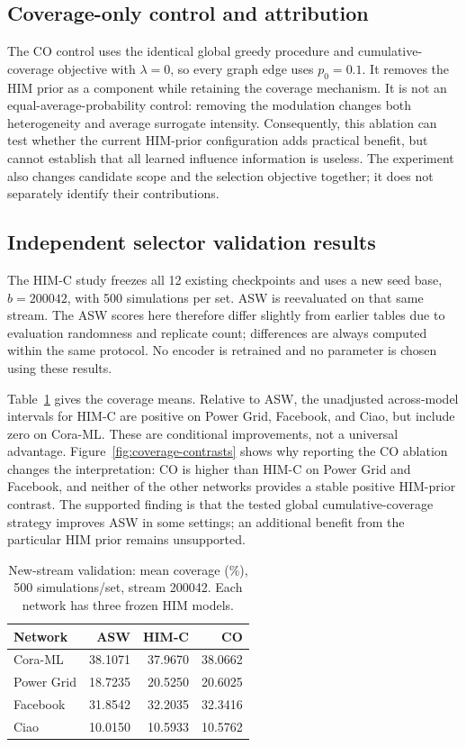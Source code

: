\subsection{Coverage-only control and attribution}
The CO control uses the identical global greedy procedure and cumulative-coverage objective with $\lambda=0$, so every graph edge uses $p_0=0.1$. It removes the HIM prior as a component while retaining the coverage mechanism. It is not an equal-average-probability control: removing the modulation changes both heterogeneity and average surrogate intensity. Consequently, this ablation can test whether the current HIM-prior configuration adds practical benefit, but cannot establish that all learned influence information is useless. The experiment also changes candidate scope and the selection objective together; it does not separately identify their contributions.

\subsection{Independent selector validation results}
The HIM-C study freezes all 12 existing checkpoints and uses a new seed base, $b=200042$, with 500 simulations per set. ASW is reevaluated on that same stream. The ASW scores here therefore differ slightly from earlier tables due to evaluation randomness and replicate count; differences are always computed within the same protocol. No encoder is retrained and no parameter is chosen using these results.

Table~\ref{tab:coverage-results} gives the coverage means. Relative to ASW, the unadjusted across-model intervals for HIM-C are positive on Power Grid, Facebook, and Ciao, but include zero on Cora-ML. These are conditional improvements, not a universal advantage. Figure~\ref{fig:coverage-contrasts} shows why reporting the CO ablation changes the interpretation: CO is higher than HIM-C on Power Grid and Facebook, and neither of the other networks provides a stable positive HIM-prior contrast. The supported finding is that the tested global cumulative-coverage strategy improves ASW in some settings; an additional benefit from the particular HIM prior remains unsupported.

\begin{table}[t]
\centering\footnotesize
\setlength{\tabcolsep}{5pt}
\caption{New-stream validation: mean coverage (\%), 500 simulations/set, stream 200042. Each network has three frozen HIM models.}
\label{tab:coverage-results}
\begin{tabular}{@{}lrrr@{}}
\toprule
Network & ASW & HIM-C & CO \\
\midrule
Cora-ML & 38.1071 & 37.9670 & 38.0662 \\
Power Grid & 18.7235 & 20.5250 & 20.6025 \\
Facebook & 31.8542 & 32.2035 & 32.3416 \\
Ciao & 10.0150 & 10.5933 & 10.5762 \\
\bottomrule
\end{tabular}
\end{table}

